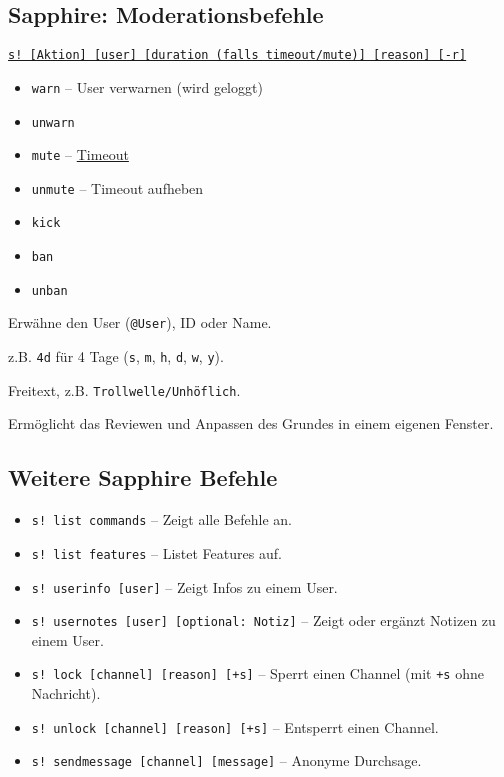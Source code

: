 \documentclass[a4paper,12pt]{article}
\begin{document}
\subsection{Sapphire: Moderationsbefehle}
\begin{description}[style=nextline]
    \item[Befehlsschema:] \hyperlink{term:command}{\texttt{s! [Aktion] [user] [duration (falls timeout/mute)] [reason] [-r]}}
    \item[Aktionen:]
    \begin{itemize}
        \item \texttt{warn} -- User verwarnen (wird geloggt)
        \item \texttt{unwarn}
        \item \texttt{mute} -- \hyperlink{term:to}{Timeout}
        \item \texttt{unmute} -- Timeout aufheben
        \item \texttt{kick}
        \item \texttt{ban}
        \item \texttt{unban}
    \end{itemize}
    \item[\texttt{[User]:}] Erwähne den User (\texttt{@User}), ID oder Name.
    \item[\texttt{[Dauer]:}] z.B. \texttt{4d} für 4 Tage (\texttt{s}, \texttt{m}, \texttt{h}, \texttt{d}, \texttt{w}, \texttt{y}).
    \item[\texttt{[Reason]:}] Freitext, z.B. \texttt{Trollwelle/Unhöflich}.
    \item[\texttt{[-r]:}] Ermöglicht das Reviewen und Anpassen des Grundes in einem eigenen Fenster.
\end{description}

\subsection{Weitere Sapphire Befehle}
\begin{itemize}
    \item \texttt{s! list commands} -- Zeigt alle Befehle an.
    \item \texttt{s! list features} -- Listet Features auf.
    \item \texttt{s! userinfo [user]} -- Zeigt Infos zu einem User.
    \item \texttt{s! usernotes [user] [optional: Notiz]} -- Zeigt oder ergänzt Notizen zu einem User.
    \item \texttt{s! lock [channel] [reason] [+s]} -- Sperrt einen Channel (mit \texttt{+s} ohne Nachricht).
    \item \texttt{s! unlock [channel] [reason] [+s]} -- Entsperrt einen Channel.
    \item \texttt{s! sendmessage [channel] [message]} -- Anonyme Durchsage.
\end{itemize}
\end{document}
